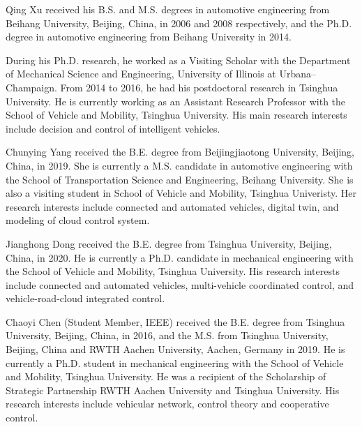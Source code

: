 \documentclass[journal]{IEEEtranTIE}
\begin{document}
\begin{IEEEbiography}
	{Qing Xu} received his B.S. and M.S. degrees in automotive engineering from Beihang University, Beijing, China, in 2006 and 2008 respectively, and the Ph.D. degree in automotive engineering from Beihang University in 2014.
	
	During his Ph.D. research, he worked as a Visiting Scholar with the Department of Mechanical Science and Engineering, University of Illinois at Urbana–Champaign. From 2014 to 2016, he had his postdoctoral research in Tsinghua University. He is currently working as an Assistant Research Professor with the  School of Vehicle and Mobility, Tsinghua University. His main research interests include decision and control of intelligent vehicles.
\end{IEEEbiography}

\begin{IEEEbiography}
	{Chunying Yang} received the B.E. degree from Beijingjiaotong University, Beijing, China, in 2019. She is currently a M.S. candidate in automotive engineering with the School of Transportation Science and Engineering, Beihang University. She is also a visiting student in School of Vehicle and Mobility, Tsinghua Univeristy. Her research interests include connected and automated vehicles, digital twin, and modeling of cloud control system.
\end{IEEEbiography}

\begin{IEEEbiography}
	{Jianghong Dong} received the B.E. degree from Tsinghua University, Beijing, China, in 2020. He is currently a Ph.D. candidate in mechanical engineering with the School of Vehicle and Mobility, Tsinghua University. His research interests include connected and automated vehicles, multi-vehicle coordinated control, and vehicle-road-cloud integrated control.
\end{IEEEbiography}


\begin{IEEEbiography}
	{Chaoyi Chen} (Student Member, IEEE) received the B.E. degree from Tsinghua University, Beijing, China, in 2016, and the M.S. from Tsinghua University, Beijing, China and RWTH Aachen University, Aachen, Germany in 2019. He is currently a Ph.D. student in mechanical engineering with the School of Vehicle and Mobility, Tsinghua University. He was a recipient of the Scholarship of Strategic Partnership RWTH Aachen University and Tsinghua University. His research interests include vehicular network, control theory and cooperative control.
\end{IEEEbiography}
\end{document}

